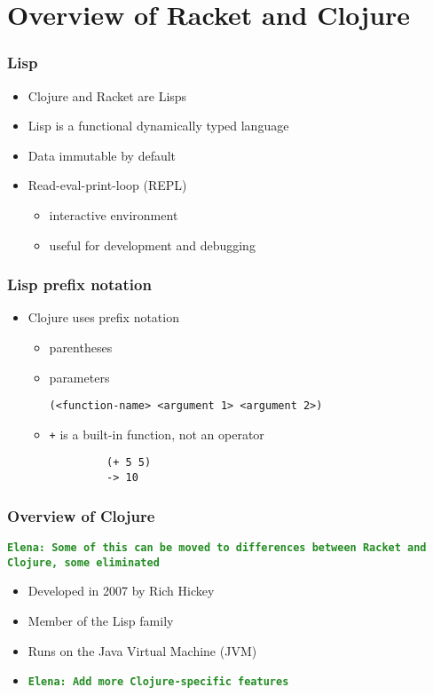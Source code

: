 \documentclass{beamer}
\newcommand{\comment}[1]{{\bf \tt  {#1}}}
\newcommand{\emcomment}[1]{\textcolor{ForestGreen}{\comment{Elena: {#1}}}}
\begin{document}
\section{Overview of Racket and Clojure}

\begin{frame}
\frametitle{Lisp}
\begin{itemize}
	\item Clojure and Racket are Lisps
	\item Lisp is a functional dynamically typed language
	\item Data immutable by default
  	 \item Read-eval-print-loop (REPL)
  	 	\begin{itemize}
  	 	\item interactive environment
  	 	\item useful for development and debugging
  	 	\end{itemize}
\end{itemize}
\end{frame}

\begin{frame}[fragile]
\frametitle{Lisp prefix notation}
	\begin{itemize}
  	  \item Clojure uses prefix notation
  	  \begin{itemize}
  	 	 \item parentheses
  	 	 \item parameters
  	 	 
  	 	 \texttt{(<function-name> <argument 1> <argument 2>)}
  	 	 \item \texttt{+} is a built-in function, not an operator
  	 	 \begin{verbatim}		
		 (+ 5 5)
		 -> 10
	     \end{verbatim}
	  \end{itemize}
   \end{itemize}
\end{frame}

\begin{frame}
\frametitle{Overview of Clojure}
\emcomment{Some of this can be moved to differences between Racket and Clojure, some eliminated}
	\begin{itemize}
		\item Developed in 2007 by Rich Hickey
		\item Member of the Lisp family
  	 \item Runs on the Java Virtual Machine (JVM)

	\item \emcomment{Add more Clojure-specific features}
	 \end{itemize}
\end{frame}
\end{document}
